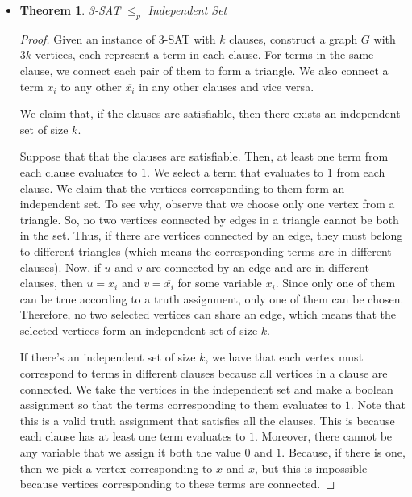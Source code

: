 \documentclass[10pt]{article}
\newtheorem{theorem}[lemma]{Theorem}
\begin{document}
\begin{itemize}
    \item \begin{theorem}
      3-SAT $\leq_p$ Independent Set
    \end{theorem}
    \begin{proof}
      Given an instance of 3-SAT with $k$ clauses, construct a graph $G$ with $3k$ vertices,
      each represent a term in each clause. For terms in the same clause, we connect each
      pair of them to form a triangle. We also connect a term $x_i$ to any other $\overline{x_i}$
      in any other clauses and vice versa.
      
      We claim that, if the clauses are satisfiable, then there exists an independent set of size $k$.
      
      Suppose that that the clauses are satisfiable. Then, at least one term from each clause evaluates
      to $1$. We select a term that evaluates to $1$ from each clause. We claim that the vertices
      corresponding to them form an independent set. To see why, observe that we choose only one vertex
      from a triangle. So, no two vertices connected by edges in a triangle cannot be both in the
      set. Thus, if there are vertices connected by an edge, they must belong to different triangles
      (which means the corresponding terms are in different clauses). Now, if $u$ and $v$ are connected
      by an edge and are in different clauses, then $u = x_i$ and $v = \overline{x_i}$ for some variable
      $x_i$. Since only one of them can be true according to a truth assignment, only one of them
      can be chosen. Therefore, no two selected vertices can share an edge, which means that the selected
      vertices form an independent set of size $k$.
      
      If there's an independent set of size $k$, we have that each vertex must correspond to
      terms in different clauses because all vertices in a clause are connected. We take the vertices
      in the independent set and make a boolean assignment so that the terms corresponding to them
      evaluates to $1$. Note that this is a valid truth assignment that satisfies all the clauses.
      This is because each clause has at least one term evaluates to $1$. Moreover, there cannot
      be any variable that we assign it both the value $0$ and $1$. Because, if there is one,
      then we pick a vertex corresponding to $x$ and $\overline{x}$, but this is impossible because
      vertices corresponding to these terms are connected.
    \end{proof}
  \end{itemize}  
  
\end{document}

